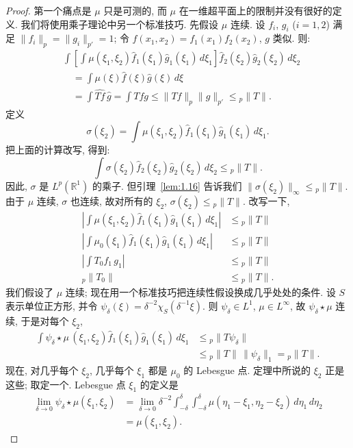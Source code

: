 \begin{proof}
第一个痛点是 $\mu$ 只是可测的, 而 $\mu$ 在一维超平面上的限制并没有很好的定义. 我们将使用乘子理论中另一个标准技巧. 先假设 $\mu$ 连续. 设 $f_i$, $g_i$ ($i=1,2$) 满足 $\|f_i\|_p=\|g_i\|_{p'}=1$; 令 $f(x_1,x_2)=f_1(x_1)f_2(x_2)$, $g$ 类似. 则:
\begin{align*}
&\int\left[\int\mu(\xi_1,\xi_2)\hat{f}_1(\xi_1)\hat{g}_1(\xi_1)\,d\xi_1\right]\hat{f}_2(\xi_2)\hat{g}_2(\xi_2)\,d\xi_2 \\
&\quad=\int\mu(\xi)\hat{f}(\xi)\hat{g}(\xi)\,d\xi \\
&\quad=\int\widehat{Tf}\,\hat{g}=\int Tfg\leq\|Tf\|_p\|g\|_{p'}\leq{}_p\|T\|.
\end{align*}
定义
\[
\sigma(\xi_2)=\int\mu(\xi_1,\xi_2)\hat{f}_1(\xi_1)\hat{g}_1(\xi_1)\,d\xi_1.
\]
把上面的计算改写, 得到:
\[
\int\sigma(\xi_2)\hat{f}_2(\xi_2)\hat{g}_2(\xi_2)\,d\xi_2\leq{}_p\|T\|.
\]
因此, $\sigma$ 是 $L^p(\mathbb{R}^1)$ 的乘子. 但引理~\ref{lem:1.16} 告诉我们 $\|\sigma(\xi_2)\|_{\infty}\leq{}_p\|T\|$. 由于 $\mu$ 连续, $\sigma$ 也连续, 故对所有的 $\xi_2$, $\sigma(\xi_2)\leq{}_p\|T\|$. 改写一下,
\begin{align*}
\left|\int\mu(\xi_1,\xi_2)\hat{f}_1(\xi_1)\hat{g}_1(\xi_1)\,d\xi_1\right|&\leq{}_p\|T\| \\
\left|\int\mu_0(\xi_1)\hat{f}_1(\xi_1)\hat{g}_1(\xi_1)\,d\xi_1\right|&\leq{}_p\|T\| \\
\left|\int T_0f_1\,g_1\right|&\leq{}_p\|T\| \\
{}_p\|T_0\|&\leq{}_p\|T\|.
\end{align*}
我们假设了 $\mu$ 连续; 现在用一个标准技巧把连续性假设换成几乎处处的条件. 设 $S$ 表示单位正方形, 并令 $\psi_{\delta}(\xi)=\delta^{-2}\chi_S(\delta^{-1}\xi)$. 则 $\psi_{\delta}\in L^1$, $\mu\in L^{\infty}$, 故 $\psi_{\delta}\star\mu$ 连续, 于是对每个 $\xi_2$,
\begin{align*}
\int\psi_{\delta}\star\mu\,(\xi_1,\xi_2)\hat{f}_1(\xi_1)\hat{g}_1(\xi_1)\,d\xi_1
&\leq{}_p\|T\psi_{\delta}\| \\
&\leq{}_p\|T\|\,\|\psi_{\delta}\|_1={}_p\|T\|.
\end{align*}
现在, 对几乎每个 $\xi_2$, 几乎每个 $\xi_1$ 都是 $\mu_0$ 的 Lebesgue 点. 定理中所说的 $\xi_2$ 正是这些; 取定一个. Lebesgue 点 $\xi_1$ 的定义是
\begin{align*}
\lim_{\delta\to0}\psi_{\delta}\star\mu(\xi_1,\xi_2)
&=\lim_{\delta\to0}\delta^{-2}\int_{-\delta}^{\delta}\int_{-\delta}^{\delta}\mu(\eta_1-\xi_1,\eta_2-\xi_2)\,d\eta_1\,d\eta_2 \\
&=\mu(\xi_1,\xi_2).
\end{align*}

\end{proof}

